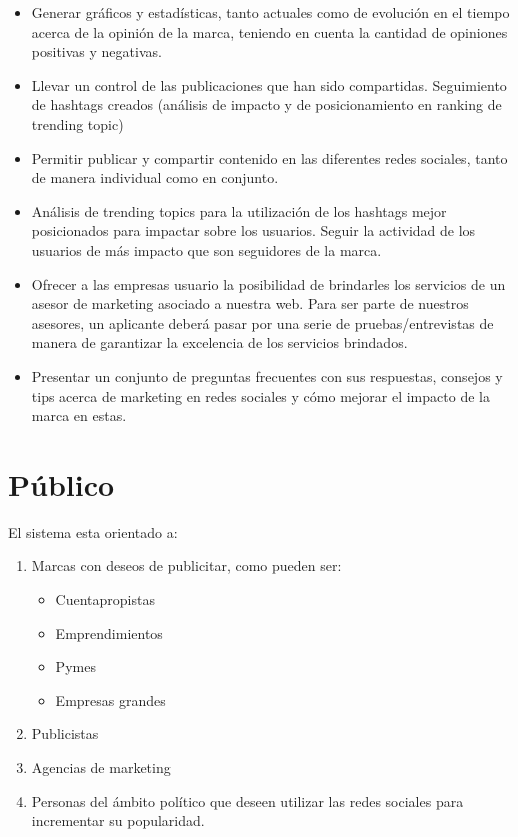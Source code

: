 \documentclass[oneside]{book}
\begin{document}
\begin{itemize}
\item Generar gráficos y estad\'{i}sticas, tanto actuales como de evoluci\'{o}n en el tiempo acerca de la opini\'{o}n de la marca, teniendo en cuenta la cantidad de opiniones positivas y negativas.

\item Llevar un control de las publicaciones que han sido compartidas.
Seguimiento de hashtags creados (an\'{a}lisis de impacto y de posicionamiento en ranking de trending topic)

\item Permitir publicar y compartir contenido en las diferentes redes sociales, tanto de manera individual como en conjunto. 

\item Análisis de trending topics para la utilización de los hashtags mejor posicionados para impactar sobre los usuarios.
Seguir la actividad de los usuarios de más impacto que son seguidores de la marca. 

\item Ofrecer a las empresas usuario la posibilidad de brindarles los servicios de un asesor de marketing asociado a nuestra web. Para ser parte de nuestros asesores, un aplicante deber\'{a} pasar por una serie de pruebas/entrevistas de manera de garantizar la excelencia de los servicios brindados. 

\item Presentar un conjunto de preguntas frecuentes con sus respuestas, consejos y tips acerca de marketing en redes sociales y cómo mejorar el impacto de la marca en estas.


\end{itemize}


\section{P\'{u}blico}


El sistema esta orientado a:

\begin{enumerate}
	\item Marcas con deseos de publicitar, como pueden ser:
	\begin{itemize}
		\item Cuentapropistas
		\item Emprendimientos 
		\item Pymes
		\item Empresas grandes
	\end{itemize}
	\item Publicistas
	\item Agencias de marketing
	\item Personas del \'{a}mbito pol\'{i}tico que deseen utilizar las redes sociales para incrementar su popularidad. 
\end{enumerate}
 
\end{document}
